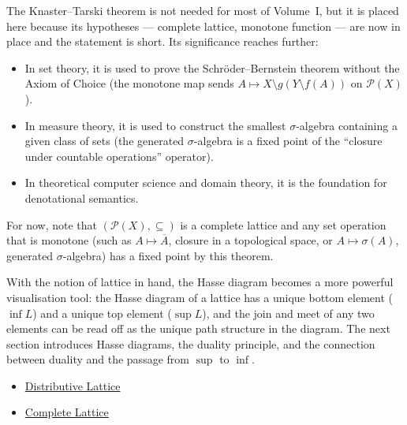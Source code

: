 \begin{remark*}
\label{rem:knaster-tarski-context}
The Knaster--Tarski theorem is not needed for most of Volume~I, but it is
placed here because its hypotheses --- complete lattice, monotone function ---
are now in place and the statement is short.  Its significance reaches
further:
\begin{itemize}
  \item In set theory, it is used to prove the Schr\"{o}der--Bernstein theorem
        without the Axiom of Choice (the monotone map sends $A \mapsto
        X \setminus g(Y \setminus f(A))$ on $\mathcal{P}(X)$).
  \item In measure theory, it is used to construct the smallest
        $\sigma$-algebra containing a given class of sets (the
        generated $\sigma$-algebra is a fixed point of the ``closure
        under countable operations'' operator).
  \item In theoretical computer science and domain theory, it is the
        foundation for denotational semantics.
\end{itemize}
For now, note that $(\mathcal{P}(X), \subseteq)$ is a complete lattice and
any set operation that is monotone (such as $A \mapsto \overline{A}$, closure
in a topological space, or $A \mapsto \sigma(A)$, generated $\sigma$-algebra)
has a fixed point by this theorem.
\end{remark*}

\begin{remark*}[Transition]
\label{rem:transition-to-hasse}
With the notion of lattice in hand, the Hasse diagram becomes a more powerful
visualisation tool: the Hasse diagram of a lattice has a unique bottom element
($\inf L$) and a unique top element ($\sup L$), and the join and meet of any
two elements can be read off as the unique path structure in the diagram.
The next section introduces Hasse diagrams, the duality principle, and the
connection between duality and the passage from $\sup$ to $\inf$.
\end{remark*}

\begin{dependencies}
\begin{itemize}
  \item \hyperref[def:distributive-lattice]{Distributive Lattice}
  \item \hyperref[def:complete-lattice]{Complete Lattice}
\end{itemize}
\end{dependencies}
